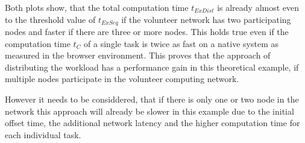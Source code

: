 Both plots show, that the total computation time $t_{ExDist}$ is already almost even to the threshold value of $t_{ExSeq}$ if the volunteer network has two participating nodes and faster if there are three or more nodes. This holds true even if the computation time $t_{C}$ of a single task is twice as fast on a native system as measured in the browser environment. This proves that the approach of distributing the workload has a performance gain in this theoretical example, if multiple nodes participate in the volunteer computing network. 

However it needs to be considdered, that if there is only one or two node in the network this approach will already be slower in this example due to the initial offset time, the additional network latency and the higher computation time for each individual task.